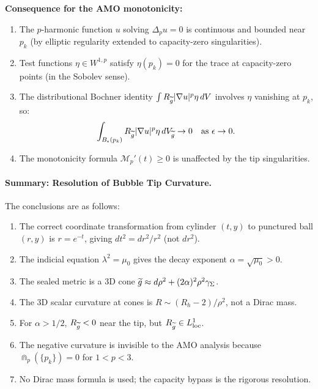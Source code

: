 \begin{lemma}
\textbf{Consequence for the AMO monotonicity:}
\begin{enumerate}
    \item The $p$-harmonic function $u$ solving $\Delta_p u = 0$ is continuous and bounded near $p_k$ (by elliptic regularity extended to capacity-zero singularities).
    \item Test functions $\eta \in W^{1,p}$ satisfy $\eta(p_k) = 0$ for the trace at capacity-zero points (in the Sobolev sense).
    \item The distributional Bochner identity $\int R_{\widetilde{g}} |\nabla u|^p \eta \, dV$ involves $\eta$ vanishing at $p_k$, so:
    \begin{equation}
        \int_{B_\epsilon(p_k)} R_{\widetilde{g}} |\nabla u|^p \eta \, dV_{\widetilde{g}} \to 0 \quad \text{as } \epsilon \to 0.
    \end{equation}
    \item The monotonicity formula $\mathcal{M}_p'(t) \ge 0$ is unaffected by the tip singularities.
\end{enumerate}

\paragraph{Summary: Resolution of Bubble Tip Curvature.}
The conclusions are as follows:
\begin{enumerate}
    \item The correct coordinate transformation from cylinder $(t, y)$ to punctured ball $(r, y)$ is $r = e^{-t}$, giving $dt^2 = dr^2/r^2$ (not $dr^2$).
    \item The indicial equation $\lambda^2 = \mu_0$ gives the decay exponent $\alpha = \sqrt{\mu_0} > 0$.
    \item The sealed metric is a 3D cone $\widetilde{g} \approx d\rho^2 + (2\alpha)^2 \rho^2 \gamma_\Sigma$.
    \item The 3D scalar curvature at cones is $R \sim (R_h - 2)/\rho^2$, not a Dirac mass.
    \item For $\alpha > 1/2$, $R_{\widetilde{g}} < 0$ near the tip, but $R_{\widetilde{g}} \in L^1_{\text{loc}}$.
    \item The negative curvature is invisible to the AMO analysis because $\Cap_p(\{p_k\}) = 0$ for $1 < p < 3$.
    \item No Dirac mass formula is used; the capacity bypass is the rigorous resolution.
\end{enumerate}
\end{lemma}

